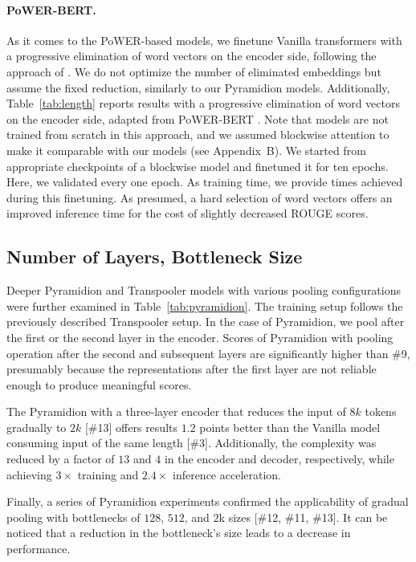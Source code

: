 \documentclass{article}
\begin{document}
{\paragraph{PoWER-BERT.}
As it comes to the PoWER-based models, we finetune Vanilla transformers with a progressive elimination of word vectors on the encoder side, following the approach of \citet{pmlr-v119-goyal20a}. We do not optimize the number of eliminated embeddings but assume the fixed reduction, similarly to our Pyramidion models.
Additionally, Table~\ref{tab:length} reports results with a progressive elimination of word vectors on the encoder side, adapted from PoWER-BERT \citep{pmlr-v119-goyal20a}. Note that models are not trained from scratch in this approach, and we assumed blockwise attention to make it comparable with our models (see Appendix~B). We started from appropriate checkpoints of a blockwise model and finetuned it for ten epochs. Here, we validated every one epoch. As training time, we provide times achieved during this finetuning. As presumed, a hard selection of word vectors offers an improved inference time for the cost of slightly decreased ROUGE scores. }


\subsection{Number of Layers, Bottleneck Size}\label{appendix_sub_pyramidion}
Deeper Pyramidion and Transpooler models with various pooling configurations were further examined in Table~\ref{tab:pyramidion}. The training setup follows the previously described Transpooler setup. In the case of Pyramidion, we pool after the first or the second layer in the encoder. 
Scores of Pyramidion with pooling operation after the second and subsequent layers are significantly higher than \#9, presumably because the representations after the first layer are not reliable enough to produce meaningful scores.

The Pyramidion with a three-layer encoder that reduces the input of $8k$ tokens gradually to $2k$ [\#13] offers results $1.2$ points better than the Vanilla model consuming input of the same length [\#3]. Additionally, the complexity was reduced by a factor of $13$ and $4$ in the encoder and decoder, respectively, while achieving $3\times$ training and $2.4\times$ inference acceleration.

Finally, a series of Pyramidion experiments confirmed the applicability of gradual pooling with bottlenecks of $128$, $512$, and $2$k sizes [\#12, \#11, \#13]. It can be noticed that a reduction in the bottleneck's size leads to a decrease in performance. 
\end{document}
